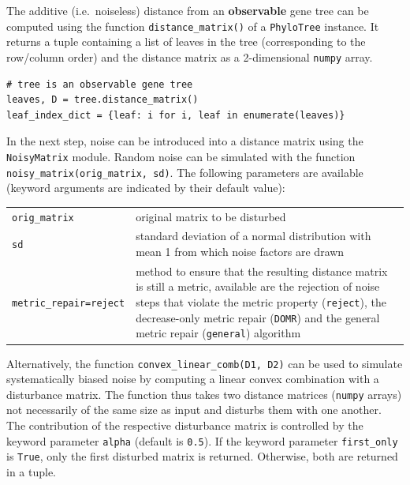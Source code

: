 \documentclass[hidelinks,11pt]{article}
\newcommand{\sq}{\textquotesingle}
\begin{document}
The additive (i.e.\ noiseless) distance from an \textbf{observable} gene tree can be computed using the function \texttt{distance\_matrix()} of a \texttt{PhyloTree} instance.
It returns a tuple containing a list of leaves in the tree (corresponding to the row/column order) and the distance matrix as a 2-dimensional \texttt{numpy} array.

\begin{adjustwidth}{1cm}{1cm}\vspace{2mm}
\begin{verbatim}
# tree is an observable gene tree
leaves, D = tree.distance_matrix()
leaf_index_dict = {leaf: i for i, leaf in enumerate(leaves)}
\end{verbatim}
\end{adjustwidth}

In the next step, noise can be introduced into a distance matrix using the \texttt{NoisyMatrix} module.
Random noise can be simulated with the function \texttt{noisy\_matrix(orig\_matrix, sd)}.
The following parameters are available (keyword arguments are indicated by their default value):

\vspace{3mm}
{\small\centering
\begin{longtable}{ p{4.5cm} p{9cm} }
	\texttt{orig\_matrix} & original matrix to be disturbed\\
	\texttt{sd}  & standard deviation of a normal distribution with mean 1 from which noise factors are drawn\\
	\texttt{metric\_repair=\sq reject\sq}  & method to ensure that the resulting
	distance matrix is still a metric, available are the rejection of noise steps
	that violate the metric property (\texttt{\sq reject\sq}), the decrease-only
	metric repair (\texttt{\sq DOMR\sq}) and the general metric repair
	(\texttt{\sq general\sq}) algorithm\\
\end{longtable}
}
\vspace{3mm}

Alternatively, the function \texttt{convex\_linear\_comb(D1, D2)} can be used to simulate systematically biased noise by computing a linear convex combination with a disturbance matrix.
The function thus takes two distance matrices (\texttt{numpy} arrays) not necessarily of the same size as input and disturbs them with one another.
The contribution of the respective disturbance matrix is controlled by the keyword parameter \texttt{alpha} (default is \texttt{0.5}).
If the keyword parameter \texttt{first\_only} is \texttt{True}, only the first disturbed matrix is returned.
Otherwise, both are returned in a tuple.
\end{document}
